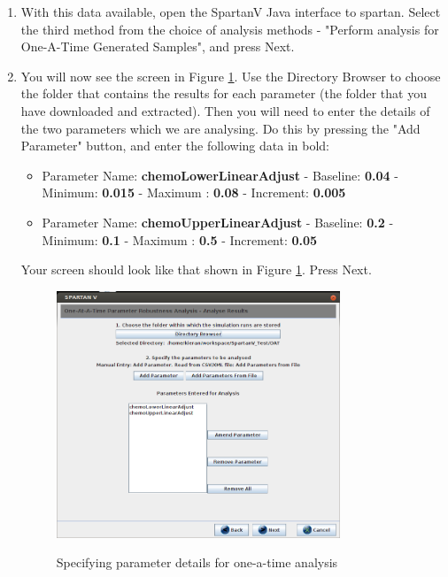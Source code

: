 \documentclass[a4paper,11pt]{article}
\begin{document}
\begin{enumerate}
\item With this data available, open the SpartanV Java interface to spartan. Select the third method from the choice of analysis methods - "Perform analysis for One-A-Time Generated Samples", and press Next.

\item You will now see the screen in Figure \ref{OAT_Screen2}. Use the Directory Browser to choose the folder that contains the results for each parameter (the folder that you have downloaded and extracted). Then you will need to enter the details of the two parameters which we are analysing. Do this by pressing the "Add Parameter" button, and enter the following data in bold:
\begin{itemize}
\item Parameter Name: \textbf{chemoLowerLinearAdjust} - Baseline: \textbf{0.04} - Minimum: \textbf{0.015} - Maximum : \textbf{0.08} - Increment: \textbf{0.005}
\item Parameter Name: \textbf{chemoUpperLinearAdjust} - Baseline: \textbf{0.2} - Minimum: \textbf{0.1} - Maximum : \textbf{0.5} - Increment: \textbf{0.05}
\end{itemize}

Your screen should look like that shown in Figure \ref{OAT_Screen2}. Press Next.

\begin{figure}
\centering
    \includegraphics[width=0.8\textwidth]{SpartanV_OAT2.png}\\ \noindent
    \caption{Specifying parameter details for one-a-time analysis}
    \label{OAT_Screen2}
    \newpage 
\end{figure}


\end{enumerate}
\end{document}
